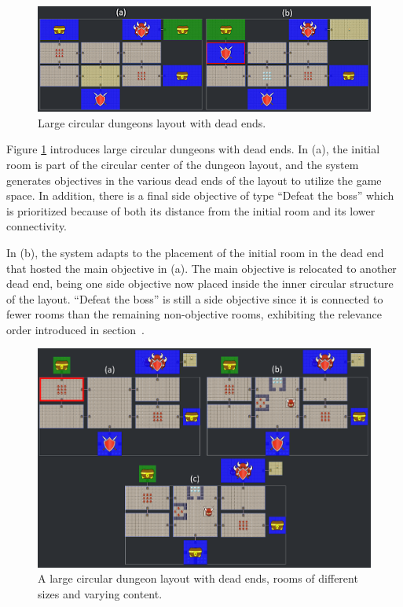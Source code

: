 \begin{figure}[h]
  \centering
  \includegraphics[width=\columnwidth]{included-papers-tex/paper-7/figures/results6.png}
  \caption{Large circular dungeons layout with dead ends.}
  \label{fig:oldfig10}
\end{figure}

Figure \ref{fig:oldfig10} introduces large circular dungeons with dead ends. In (a), the initial room is part of the circular center of the dungeon layout, and the system generates objectives in the various dead ends of the layout to utilize the game space. In addition, there is a final side objective of type “Defeat the boss” which is prioritized because of both its distance from the initial room and its lower connectivity.%

In (b), the system adapts to the placement of the initial room in the dead end that hosted the main objective in (a). The main objective is relocated to another dead end, being one side objective now placed inside the inner circular structure of the layout. “Defeat the boss” is still a side objective since it is connected to fewer rooms than the remaining non-objective rooms, exhibiting the relevance order introduced in section~.%

\begin{figure}[h]
  \centering
  \includegraphics[width=\columnwidth]{included-papers-tex/paper-7/figures/results7.png}
  \caption{A large circular dungeon layout with dead ends, rooms of different sizes and varying content.}
  \label{fig:oldfig11}
\end{figure}


